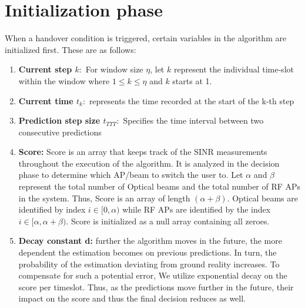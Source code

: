 \section{Initialization phase}
When a handover condition is triggered, certain variables in the algorithm are initialized first. These are as follows:
\begin{enumerate}
    \item \textbf{Current step $k:$} For window size $\eta$, let $k$ represent the individual time-slot within the window where $1 \leq k \leq \eta$ and $k$ starts at 1. 
    \item \textbf{Current time $t_k:$} represents the time recorded at the start of the k-th step 
    \item \textbf{Prediction step size $t_{TTT}:$} Specifies the time interval between two consecutive predictions
    \item \textbf{Score:} Score is an array that keeps track of the SINR measurements throughout the execution of the algorithm. It is analyzed in the decision phase to determine which AP/beam to switch the user to. Let $\alpha$ and $\beta$ represent the total number of Optical beams and the total number of RF APs in the system. Thus, Score is an array of length $(\alpha + \beta)$. Optical beams are identified by index $i \in [0, \alpha)$ while RF APs are identified by the index $i \in [\alpha, \alpha + \beta)$. Score is initialized as a null array containing all zeroes.
    \item \textbf{Decay constant d:} further the algorithm moves in the future, the more dependent the estimation becomes on previous predictions. In turn, the probability of the estimation deviating from ground reality increases. To compensate for such a potential error, We utilize exponential decay on the score per timeslot. Thus, as the predictions move further in the future, their impact on the score and thus the final decision reduces as well.
\end{enumerate}
